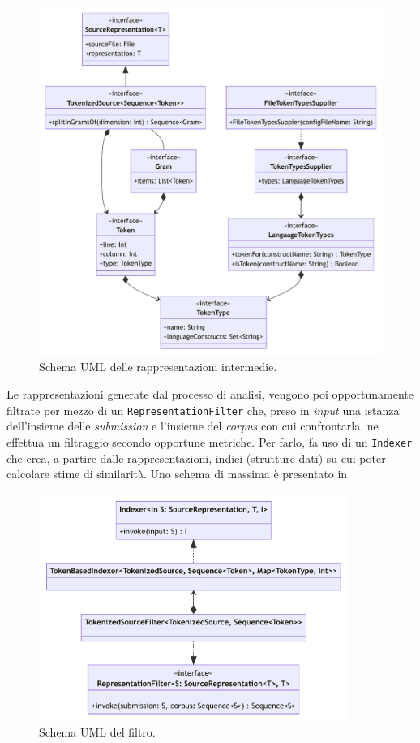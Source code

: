 \begin{figure}[h!]
    \centering
    \includegraphics[width=\textwidth]{resources/img/02-representations.pdf}
    \caption{Schema UML delle rappresentazioni intermedie.}
    \label{img:02-representations}
\end{figure}

Le rappresentazioni generate dal processo di analisi, vengono poi opportunamente filtrate per mezzo di un \texttt{RepresentationFilter} che, preso in \textit{input} una istanza dell'insieme delle \textit{submission} e l'insieme del \textit{corpus} con cui confrontarla, ne effettua un filtraggio secondo opportune metriche.
%
Per farlo, fa uso di un \texttt{Indexer} che crea, a partire dalle rappresentazioni, indici (strutture dati) su cui poter calcolare stime di similarità.
%
Uno schema di massima è presentato in 

\begin{figure}[h!]
    \centering
    \includegraphics[width=0.9\textwidth]{resources/img/02-filter.pdf}
    \caption{Schema UML del filtro.}
    \label{img:02-filter}
\end{figure}


